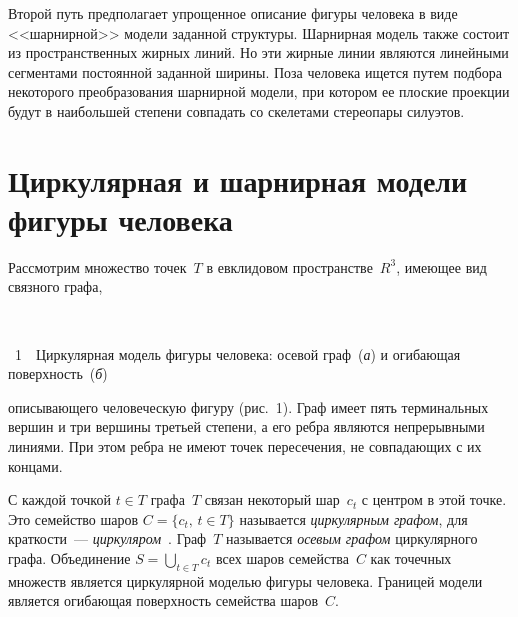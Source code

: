 \begin{multicols}{2}
     Второй путь предполагает упрощенное описание фигуры человека в виде 
<<шарнирной>> модели заданной структуры. Шарнирная модель также 
состоит из пространственных жирных линий. Но эти жирные линии являются 
линейными сегментами постоянной заданной ширины. Поза человека ищется 
путем подбора некоторого преобразования шарнирной модели, при котором ее 
плоские проекции будут в наибольшей степени совпадать со скелетами 
стереопары силуэтов. 

\vspace*{-12pt}

\section{Циркулярная и шарнирная модели фигуры человека}

     Рассмотрим множество точек~$T$ в евклидовом пространстве~$R^3$, 
имеющее вид связного графа,\linebreak

\noindent
\begin{center} %
\vspace*{-6pt}
\mbox{%
\epsfxsize=76.379mm
}
\end{center}
\vspace*{3pt}
{{\figurename~1}\ \ \small{Циркулярная модель фигуры человека: осевой граф~(\textit{а}) и огибающая 
поверхность~(\textit{б})}}
\vspace*{3pt}

\bigskip
\addtocounter{figure}{1}

\noindent
описывающего человеческую фигуру 
(рис.~1). Граф имеет пять терминальных вершин и три вершины 
третьей степени, а его ребра являются непрерывными линиями. При этом ребра 
не имеют точек пересечения, не совпадающих с их концами.

   
     С каждой точкой $t\in T$ графа~$T$ связан некоторый шар~$c_t$ с 
центром в этой точке. Это семейство шаров $C=\{c_t,\,t\in T\}$ называется 
\textit{циркулярным графом}, для краткости~--- \textit{циркуляром}~\cite{5ts}. 
Граф~$T$ называется \textit{осевым графом} циркулярного графа.\linebreak 
Объединение $S=\bigcup\limits_{t\in T} c_t$ всех шаров семейства~$C$ как 
точечных множеств является циркулярной мо\-делью фигуры человека. 
Границей модели является огибающая поверхность семейства шаров~$C$. 
     

\end{multicols}
